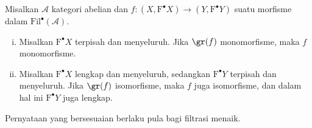 \begin{proposisi}\label{prop:gr-isom}
	Misalkan $\mathcal{A}$ kategori abelian dan
	$f:(X,\mathrm{F}^\bullet X)\to(Y,\mathrm{F}^\bullet Y)$ suatu morfisme dalam
	$\mathrm{Fil}^\bullet(\mathcal{A})$.
	\begin{enumerate}[(i)]
		\item Misalkan $\mathrm{F}^\bullet X$ terpisah dan menyeluruh. Jika
		$\gr(f)$ monomorfisme, maka $f$ monomorfisme.
		\item Misalkan $\mathrm{F}^\bullet X$ lengkap dan menyeluruh, sedangkan
		$\mathrm{F}^\bullet Y$ terpisah dan menyeluruh. Jika $\gr(f)$
		isomorfisme, maka $f$ juga isomorfisme, dan dalam hal ini
		$\mathrm{F}^\bullet Y$ juga lengkap.
	\end{enumerate}
	Pernyataan yang bersesuaian berlaku pula bagi filtrasi menaik.
\end{proposisi}
